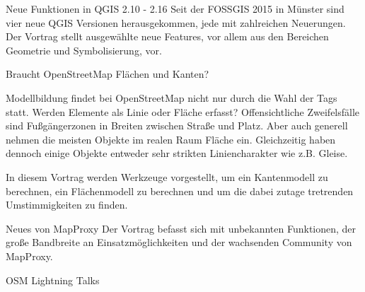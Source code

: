 %
{Neue Funktionen in QGIS 2.10 - 2.16}%
{}%
{Seit der FOSSGIS 2015 in Münster sind vier neue QGIS Versionen herausgekommen, jede mit zahlreichen Neuerungen. Der Vortrag stellt ausgewählte neue Features, vor allem aus den Bereichen Geometrie und Symbolisierung, vor.}

%
{Braucht OpenStreetMap Flächen und Kanten?}%
{}%
{Modellbildung findet bei OpenStreetMap nicht nur durch die Wahl der Tags statt.
Werden Elemente als Linie oder Fläche erfasst?
Offensichtliche Zweifelsfälle sind Fußgängerzonen in Breiten zwischen Straße und Platz.
Aber auch generell nehmen die meisten Objekte im realen Raum Fläche ein.
Gleichzeitig haben dennoch einige Objekte entweder sehr strikten Liniencharakter wie z.B. Gleise.

In diesem Vortrag werden Werkzeuge vorgestellt,
um ein Kantenmodell zu berechnen, ein Flächenmodell zu berechnen
und um die dabei zutage tretrenden Umstimmigkeiten zu finden.
}


%
{Neues von MapProxy}%
{}%
{Der Vortrag befasst sich mit unbekannten Funktionen, der große Bandbreite an Einsatzmöglichkeiten und der wachsenden Community von MapProxy.}


%
{OSM Lightning Talks}%
{}%
{}
